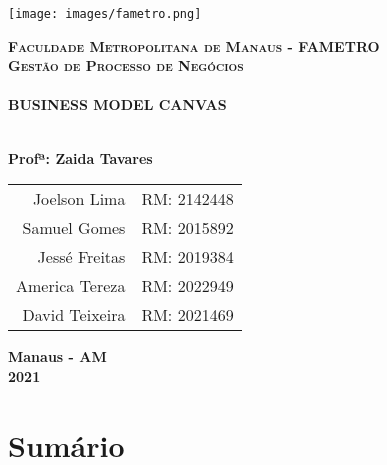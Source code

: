 \documentclass[a4paper]{article}
\begin{document}

\begin{titlepage}
\centering \texttt{[image: images/fametro.png]}

\textsc{\textbf{\Large Faculdade Metropolitana de Manaus - FAMETRO}}\\[0.5cm]
\textsc{\textbf{\Large Gestão de Processo de Negócios}}\\[0.5cm]

\vspace{1.0cm}
\HRule \\[0.4cm]
{\huge \textbf{BUSINESS MODEL CANVAS}} \\[0.25cm]
\HRule \\[1.0cm]
\vspace{1.0cm}

\textbf{\Large Profª: Zaida Tavares} \\[0.4cm]
\vspace{0.5cm}
\begin{flushright}
    \begin{tabular}{r|l}
            Joelson Lima & RM: 2142448 \\
            Samuel Gomes & RM: 2015892 \\
            Jessé Freitas & RM: 2019384 \\
            America Tereza & RM: 2022949 \\
            David Teixeira & RM: 2021469
    \end{tabular}
\end{flushright}

\vfill
\textbf{\large Manaus - AM}\\[0.5cm]
\textbf{\large 2021}

\end{titlepage}

\section{Sumário}
\end{document}
